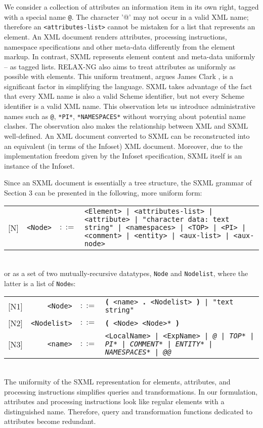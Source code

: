 \documentclass[10pt]{article}
\begin{document}
We consider a collection of attributes an information item in its
own right, tagged with a special name \texttt{@}. The character '@'
may not occur in a valid XML name; therefore
an \texttt{<attributes-list>} cannot be mistaken for a list that represents an element. An XML
document renders attributes, processing instructions, namespace
specifications and other meta-data differently from the element
markup. In contrast, SXML represents element content and meta-data
uniformly -- as tagged lists. RELAX-NG also aims to treat attributes
as uniformly as possible with elements. This uniform treatment, argues James
Clark \cite{RNG-Design}, is a significant factor
in simplifying the language.  SXML takes advantage of the fact that
every XML name is also a valid Scheme identifier, but not every
Scheme identifier is a valid XML name. This observation lets us
introduce administrative names such as \texttt{@}, \texttt{*PI*}, \texttt{*NAMESPACES*} without worrying about potential name
clashes. The observation also makes the relationship between XML and SXML
well-defined. An XML document converted to SXML can be reconstructed
into an equivalent (in terms of the Infoset) XML document. Moreover, due
to the implementation freedom given by the Infoset specification, SXML
itself is an instance of the Infoset.

Since an SXML document is essentially a tree structure, the SXML grammar of Section 3 can be presented in the following, more uniform form:

\begin{tabular}{rrcp{2.8in}}
{[}N{]} & \texttt{<Node>} &  $::=$ & \texttt{<Element> | <attributes-list> | <attribute> | "character data: text string" | <namespaces> | <TOP> | <PI> | <comment> | <entity> | <aux-list> | <aux-node> } \\
\end{tabular}
\\
or as a set of two mutually-recursive datatypes, 
\texttt{Node} and \texttt{Nodelist}, where the latter is a list of \texttt{Node}s: 

\begin{tabular}{rrcp{2.8in}}
{[}N1{]} & \texttt{<Node>} &  $::=$ & \texttt{\textbf{(} <name>\textbf{ . }<Nodelist> \textbf{)} | "text string" } \\
{[}N2{]} & \texttt{<Nodelist>} &  $::=$ & \texttt{\textbf{(} <Node> <Node>* \textbf{)} } \\
{[}N3{]} & \texttt{<name>} &  $::=$ & \texttt{<LocalName> | <ExpName> | {\itshape @} | {\itshape *TOP*} | {\itshape *PI*} | {\itshape *COMMENT*} | {\itshape *ENTITY*} | {\itshape *NAMESPACES*} | {\itshape @@} } \\
\end{tabular}
\\
The uniformity of the SXML representation for elements,
attributes, and processing instructions simplifies queries and
transformations. In our formulation, attributes and processing
instructions look like regular elements with a distinguished
name. Therefore, query and transformation functions dedicated to
attributes become redundant.
\end{document}
